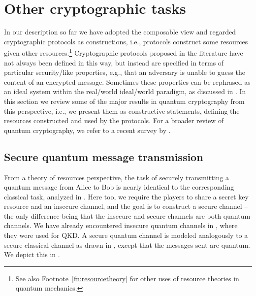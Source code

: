 \section{Other cryptographic tasks}
\label{sec:other}

In our description so far we have adopted the composable view and
regarded cryptographic protocols as constructions, i.e., protocols
construct some resources given other resources.\footnote{See also
  Footnote~\ref{fn:resourcetheory} for other uses of resource theories
  in quantum mechanics.} Cryptographic protocols proposed in the
literature have not always been defined in this way, but instead are
specified in terms of particular security\-/like properties, e.g.,
that an adversary is unable to guess the content of an encrypted
message. Sometimes these properties can be rephrased as an ideal
system within the real\-/world ideal\-/world paradigm, as discussed in
. In this section we review some of the major
results in quantum cryptography from this perspective, i.e., we
present them as constructive statements, defining the resources
constructed and used by the protocols. For a broader review of quantum
cryptography, we refer to a recent survey by \textcite{BS16}.


\subsection{Secure quantum message transmission}
\label{sec:qmt}

From a theory of resources perspective, the task of securely
transmitting a quantum message from Alice to Bob is nearly identical
to the corresponding classical task, analyzed in . Here too, we
require the players to share a secret key resource and an insecure
channel, and the goal is to construct a secure channel \--- the only
difference being that the insecure and secure channels are both
quantum channels. We have already encountered insecure quantum
channels in , where they were used for QKD. A secure
quantum channel is modeled analogously to a secure classical channel
as drawn in , except that the messages
sent are quantum. We depict this in
.


